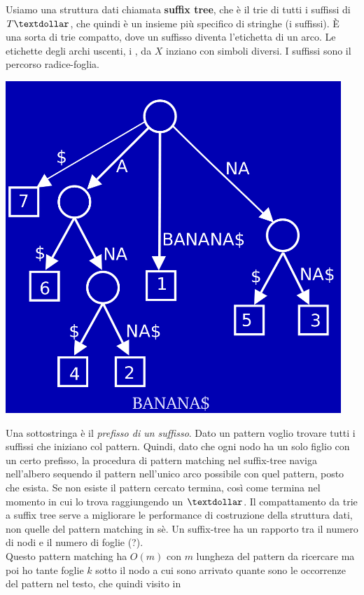 \documentclass[a4paper,12pt, oneside]{book}
\begin{document}
Usiamo una struttura dati chiamata \textbf{suffix tree}, che è il trie
di tutti i suffissi di $T\textdollar$, che quindi è un insieme più specifico di
stringhe (i suffissi). È una sorta di trie compatto, dove un suffisso
diventa l'etichetta di un arco. Le etichette degli archi uscenti, i
, da $X$ inziano con simboli diversi. I suffissi sono il
percorso radice-foglia.
\begin{center}
  \includegraphics[scale = 0.5]{img/suf.png}
\end{center}
Una sottostringa è il \textit{prefisso di un suffisso}. Dato un
pattern voglio trovare tutti i suffissi che iniziano col
pattern. Quindi, dato che ogni nodo ha un solo figlio con un certo
prefisso, la procedura di pattern matching nel suffix-tree naviga
nell'albero sequendo il pattern nell'unico arco possibile con quel
pattern, posto che esista. Se non esiste il pattern cercato termina,
così come termina nel momento in cui lo trova raggiungendo un
$\textdollar$. Il compattamento da trie a suffix tree serve a
migliorare le performance di costruzione della struttura dati, non
quelle del pattern matching in sè. Un suffix-tree ha un rapporto tra
il numero di nodi e il numero di foglie (?).\\
Questo pattern matching ha $O(m)$ con $m$ lungheza del pattern da
ricercare ma poi ho tante foglie $k$ sotto il nodo a cui sono arrivato
quante sono le occorrenze del pattern nel testo, che quindi visito in
\end{document}
